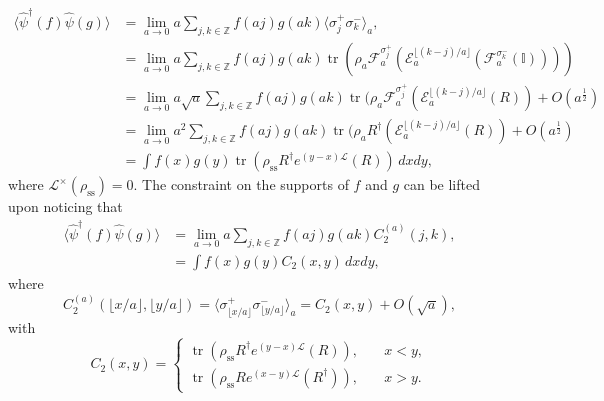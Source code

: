 \documentclass[prl,twocolumn,lengthcheck,superscriptaddress]{revtex4-1}
\newcommand{\tr}{\operatorname{tr}}
\theoremstyle{definition}
\theoremstyle{remark}
\begin{document}
\begin{equation}
	\begin{split}
	\langle\widehat{\psi}^\dag(f)\widehat{\psi}(g)\rangle &= \lim_{a\rightarrow 0} a\sum_{j,k\in\mathbb{Z}} f(aj)g(ak)\langle \sigma^+_j \sigma^-_k \rangle_a, \\
	&= \lim_{a\rightarrow 0}a\sum_{j,k\in\mathbb{Z}} f(aj)g(ak)\tr(\rho_a \mathcal{F}_a^{ \sigma^+_j}(\mathcal{E}_a^{\lfloor (k-j)/a \rfloor}(\mathcal{F}_a^{ \sigma^-_k}(\mathbb{I})))) \\
	&= \lim_{a\rightarrow 0}a \sqrt{a}\sum_{j,k\in\mathbb{Z}} f(aj)g(ak)\tr(\rho_a \mathcal{F}_a^{ \sigma^+_j}(\mathcal{E}_a^{\lfloor (k-j)/a \rfloor}(R)) + O(a^{\frac{1}{2}})\\
	&= \lim_{a\rightarrow 0}a^2\sum_{j,k\in\mathbb{Z}} f(aj)g(ak)\tr(\rho_a R^\dag (\mathcal{E}_a^{\lfloor (k-j)/a \rfloor}(R)) + O(a^{\frac{1}{2}}) \\
	&= \int f(x) g(y) \tr(\rho_{\text{ss}} R^\dag e^{(y-x)\mathcal{L}}(R))\,dxdy,
	\end{split}
\end{equation}
where $\mathcal{L}^\times(\rho_{\text{ss}}) = 0$. The constraint on the supports of $f$ and $g$ can be lifted upon noticing that
\begin{equation}
	\begin{split}
	\langle\widehat{\psi}^\dag(f)\widehat{\psi}(g)\rangle &= \lim_{a\rightarrow 0} a\sum_{j,k\in\mathbb{Z}} f(aj)g(ak)C_2^{(a)}(j,k), \\
	&= \int f(x) g(y) C_2(x,y)\,dxdy,
	\end{split}
\end{equation}
where 
\begin{equation}
	C_2^{(a)}(\lfloor x/a \rfloor,\lfloor y/a \rfloor) = \langle \sigma^+_{\lfloor x/a \rfloor} \sigma^-_{\lfloor y/a \rfloor} \rangle_a = C_2(x,y) + O(\sqrt{a}),
\end{equation}
with
\begin{equation}
	C_2(x,y) = \begin{cases} \tr(\rho_{\text{ss}} R^\dag e^{(y-x)\mathcal{L}}(R)), \quad &x<y, \\ \tr(\rho_{\text{ss}} R e^{(x-y)\mathcal{L}}(R^\dag)), \quad &x>y. \end{cases}
\end{equation}
\end{document}
